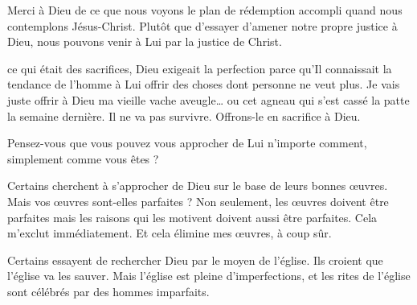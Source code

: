 
Merci à Dieu de ce que nous voyons le plan de rédemption accompli
 quand nous contemplons Jésus-Christ.
 Plutôt que d'essayer d'amener notre propre justice à Dieu,
 nous pouvons venir à Lui par la justice de Christ. 

\dvrule






 ce qui était des sacrifices,
 Dieu exigeait la perfection parce qu'Il connaissait la tendance
 de l'homme à Lui offrir des choses dont personne ne veut plus.
 \og Je vais juste offrir à Dieu ma vieille vache aveugle\dots{}
 ou cet agneau qui s'est cassé la patte la semaine dernière.
 Il ne va pas survivre. Offrons-le en sacrifice à Dieu. \fg{}


Pensez-vous que vous pouvez vous approcher de Lui n'importe comment,
 simplement comme vous êtes ? 

Certains cherchent à s'approcher de Dieu sur le base de leurs bonnes œuvres.
 Mais vos œuvres sont-elles parfaites ?
 Non seulement, les œuvres doivent être parfaites mais les raisons
 qui les motivent doivent aussi être parfaites. Cela m'exclut immédiatement.
 Et cela élimine mes œuvres, à coup sûr. 

Certains essayent de rechercher Dieu par le moyen de l'église. 
 Ils croient que l'église 
 va les sauver. Mais l'église est pleine d'imperfections,
 et les rites de l'église sont célébrés par des hommes imparfaits. 

